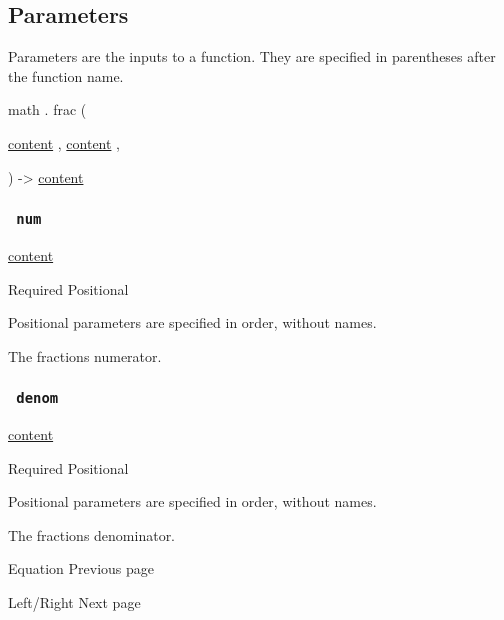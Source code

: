 \subsection{\texorpdfstring{{ Parameters
}}{ Parameters }}\label{parameters}

\label{parameters-tooltip}
Parameters are the inputs to a function. They are specified in
parentheses after the function name.

math { . } { frac } (

{ \href{/docs/reference/foundations/content/}{content} , } {
\href{/docs/reference/foundations/content/}{content} , }

) -\textgreater{} \href{/docs/reference/foundations/content/}{content}

\subsubsection{\texorpdfstring{\texttt{\ num\ }}{ num }}\label{parameters-num}

\href{/docs/reference/foundations/content/}{content}

{Required} {{ Positional }}

\label{parameters-num-positional-tooltip}
Positional parameters are specified in order, without names.

The fraction\textquotesingle s numerator.

\subsubsection{\texorpdfstring{\texttt{\ denom\ }}{ denom }}\label{parameters-denom}

\href{/docs/reference/foundations/content/}{content}

{Required} {{ Positional }}

\label{parameters-denom-positional-tooltip}
Positional parameters are specified in order, without names.

The fraction\textquotesingle s denominator.

\href{/docs/reference/math/equation/}{\pandocbounded{}}

{ Equation } { Previous page }

\href{/docs/reference/math/lr/}{\pandocbounded{}}

{ Left/Right } { Next page }

